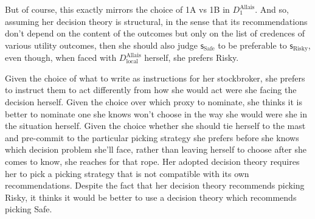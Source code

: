 \documentclass[a4paper,final]{article}
\newcommand\s{\mathsf{s}}
\renewcommand{\color}[1]{}
\newenvironment{colored}[1]{\leavevmode\color{#1}}{}
\newenvironment{CCM rewritten}
{\begingroup\color{blue}} %
{\endgroup}              %
\begin{document}
But of course, this exactly mirrors the choice of 1A vs 1B in $D^{\mathrm{Allais}}_1$. And so, assuming her decision theory is structural, in the sense that its recommendations don't depend on the content of the outcomes but only on the list of credences of various utility outcomes, then she should also judge $\s_{\mathrm{Safe}}$ to be preferable to $\s_{\mathrm{Risky}}$, even though, when faced with  $D^{\mathrm{Allais}}_{\mathrm{local}}$ herself, she prefers Risky.


Given the choice of what to write as instructions for her stockbroker, she prefers to instruct them to act differently from how she would act were she facing the decision herself. Given the choice over which proxy to nominate, she thinks it is better to nominate one she knows won't choose in the way she would were she in the situation herself. 
Given the choice whether she should tie herself to the mast and pre-commit to the particular picking strategy she prefers before she knows which decision problem she'll face, rather than leaving herself to choose after she comes to know, she reaches for that rope. %
 Her adopted decision theory requires her to pick a picking strategy that is not compatible with its own recommendations. 
Despite the fact that her decision theory recommends picking Risky, it thinks it would be better to use a decision theory which recommends picking Safe.

\end{document}
